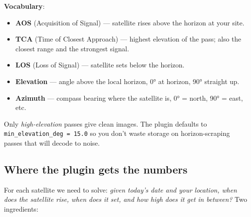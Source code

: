 \documentclass[11pt,a4paper]{article}
\begin{document}
\begin{center}
\end{center}

\textbf{Vocabulary}:
\begin{itemize}
  \item \textbf{AOS} (Acquisition of Signal) — satellite rises above
        the horizon at your site.
  \item \textbf{TCA} (Time of Closest Approach) — highest elevation
        of the pass; also the closest range and the strongest signal.
  \item \textbf{LOS} (Loss of Signal) — satellite sets below the horizon.
  \item \textbf{Elevation} — angle above the local horizon, 0° at
        horizon, 90° straight up.
  \item \textbf{Azimuth} — compass bearing where the satellite is,
        0° = north, 90° = east, etc.
\end{itemize}

Only \emph{high-elevation} passes give clean images.  The plugin
defaults to \texttt{min\_elevation\_deg = 15.0} so you don't waste
storage on horizon-scraping passes that will decode to noise.

\subsection{Where the plugin gets the numbers}

For each satellite we need to solve: \emph{given today's date and
your location, when does the satellite rise, when does it set, and
how high does it get in between?}  Two ingredients:
\end{document}
